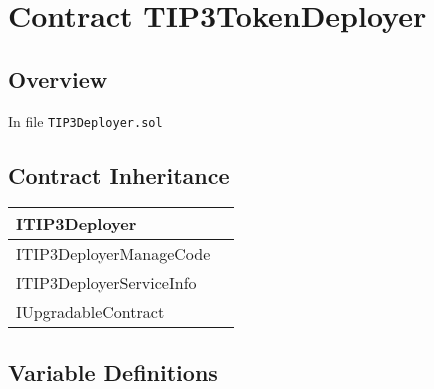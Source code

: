 
\chapter{Contract TIP3TokenDeployer}

\minitoc

\section{Overview}


In file {\tt TIP3Deployer.sol}

\section{Contract Inheritance}


\noindent\begin{tabular}{|l|p{5cm}|}\hline
ITIP3Deployer & \\\hline
ITIP3DeployerManageCode & \\\hline
ITIP3DeployerServiceInfo & \\\hline
IUpgradableContract & \\\hline
\end{tabular}


\section{Variable Definitions}



